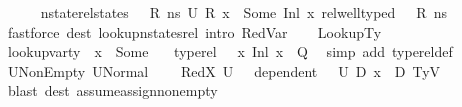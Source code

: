\begin{isabellebody}
\ \ \ \ \isamarkupfalse%
\ {\isacartoucheopen}nstate{\isacharunderscore}{\kern0pt}rel{\isacharunderscore}{\kern0pt}states\ {\isasymLambda}\ {\isasymLambda}{\isacharprime}{\kern0pt}\ R\ ns\ U{}{\isacartoucheclose}\ {\isacartoucheopen}R\ x\ {\isacharequal}{\kern0pt}\ Some\ {\isacharparenleft}{\kern0pt}Inl\ x{}{\isacharparenright}{\kern0pt}{\isacartoucheclose}\ {\isacartoucheopen}rel{\isacharunderscore}{\kern0pt}well{\isacharunderscore}{\kern0pt}typed\ {\isasymLambda}\ {\isasymOmega}\ R\ ns{\isacartoucheclose}\ \isamarkupfalse%
\ {\isacharparenleft}{\kern0pt}fastforce\ dest{\isacharcolon}{\kern0pt}\ lookup{\isacharunderscore}{\kern0pt}nstates{\isacharunderscore}{\kern0pt}rel\ intro{\isacharcolon}{\kern0pt}\ RedVar{\isacharparenright}{\kern0pt}\isanewline
\ \ \isamarkupfalse%
\ LookupTy\ \isamarkupfalse%
\ {\isachardoublequoteopen}lookup{\isacharunderscore}{\kern0pt}var{\isacharunderscore}{\kern0pt}ty\ {\isasymLambda}{\isacharprime}{\kern0pt}\ x{}\ {\isacharequal}{\kern0pt}\ Some\ {\isasymtau}{\isachardoublequoteclose}\ \isamarkupfalse%
\ {\isacartoucheopen}type{\isacharunderscore}{\kern0pt}rel\ {\isasymLambda}\ {\isasymLambda}{\isacharprime}{\kern0pt}\ {\isacharparenleft}{\kern0pt}{\isacharparenleft}{\kern0pt}x{\isacharcomma}{\kern0pt}\ Inl\ x{}{\isacharparenright}{\kern0pt}\ {\isacharhash}{\kern0pt}\ Q{\isacharparenright}{\kern0pt}{\isacartoucheclose}\ \isamarkupfalse%
\ {\isacharparenleft}{\kern0pt}simp\ add{\isacharcolon}{\kern0pt}\ type{\isacharunderscore}{\kern0pt}rel{\isacharunderscore}{\kern0pt}def{\isacharparenright}{\kern0pt}\isanewline
\ \ \isamarkupfalse%
\ U{}NonEmpty{\isacharcolon}{\kern0pt}\ {\isachardoublequoteopen}{\isacharquery}{\kern0pt}U{}Normal\ {\isasymnoteq}\ {\isacharbraceleft}{\kern0pt}{\isacharbraceright}{\kern0pt}{\isachardoublequoteclose}\ \isamarkupfalse%
\ RedX{}\ {\isacartoucheopen}U{}\ {\isasymnoteq}\ {\isacharbraceleft}{\kern0pt}{\isacharbraceright}{\kern0pt}{\isacartoucheclose}\ {\isacartoucheopen}dependent\ {\isasymLambda}{\isacharprime}{\kern0pt}\ {\isasymOmega}\ U{}\ D{}{\isacartoucheclose}\ {\isacartoucheopen}x{}\ {\isasymnotin}\ D{}{\isacartoucheclose}\ TyV\isanewline
\ \ \ \ \ \isamarkupfalse%
\ {\isacharparenleft}{\kern0pt}blast\ dest{\isacharcolon}{\kern0pt}\ assume{\isacharunderscore}{\kern0pt}assign{\isacharunderscore}{\kern0pt}non{\isacharunderscore}{\kern0pt}empty{\isacharparenright}{\kern0pt}\isanewline

\end{isabellebody}
